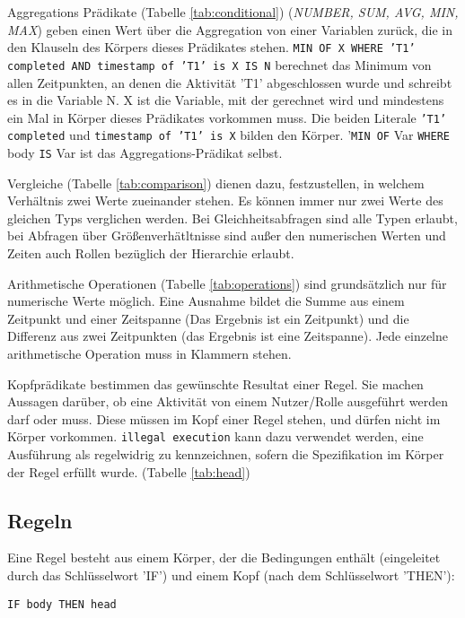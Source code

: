 Aggregations Prädikate (Tabelle \ref{tab:conditional}) (\textit{NUMBER, SUM, AVG, MIN, MAX}) geben einen Wert über die Aggregation von einer Variablen zurück, die in den Klauseln des Körpers dieses Prädikates stehen. \texttt{MIN OF X WHERE 'T1' completed AND timestamp of 'T1' is X IS N} berechnet das Minimum von allen Zeitpunkten, an denen die Aktivität 'T1' abgeschlossen wurde und schreibt es in die Variable N. X ist die Variable, mit der gerechnet wird und mindestens ein Mal in Körper dieses Prädikates vorkommen muss. Die beiden Literale \texttt{'T1' completed} und \texttt{timestamp of 'T1' is X} bilden den Körper. '\texttt{MIN OF} Var \texttt{WHERE} body \texttt{IS} Var ist das Aggregations-Prädikat selbst.



Vergleiche (Tabelle \ref{tab:comparison}) dienen dazu, festzustellen, in welchem Verhältnis zwei Werte zueinander stehen. Es können immer nur zwei Werte des gleichen Typs verglichen werden. Bei Gleichheitsabfragen sind alle Typen erlaubt, bei Abfragen über Größenverhätltnisse sind außer den numerischen Werten und Zeiten auch Rollen bezüglich der Hierarchie erlaubt.


Arithmetische Operationen (Tabelle \ref{tab:operations}) sind grundsätzlich nur für numerische Werte möglich. Eine Ausnahme bildet die Summe aus einem Zeitpunkt und einer Zeitspanne (Das Ergebnis ist ein Zeitpunkt) und die Differenz aus zwei Zeitpunkten (das Ergebnis ist eine Zeitspanne). Jede einzelne arithmetische Operation muss in Klammern stehen.

Kopfprädikate bestimmen das gewünschte Resultat einer Regel. Sie machen Aussagen darüber, ob eine Aktivität von einem Nutzer/Rolle ausgeführt werden darf oder muss. Diese müssen im Kopf einer Regel stehen, und dürfen nicht im Körper vorkommen. \texttt{illegal execution} kann dazu verwendet werden, eine Ausführung als regelwidrig zu kennzeichnen, sofern die Spezifikation im Körper der Regel erfüllt wurde. (Tabelle \ref{tab:head})




\subsection{Regeln}

Eine Regel besteht aus einem Körper, der die Bedingungen enthält (eingeleitet durch das Schlüsselwort 'IF') und einem Kopf (nach dem Schlüsselwort 'THEN'):
\begin{verbatim}
IF body THEN head
\end{verbatim}

